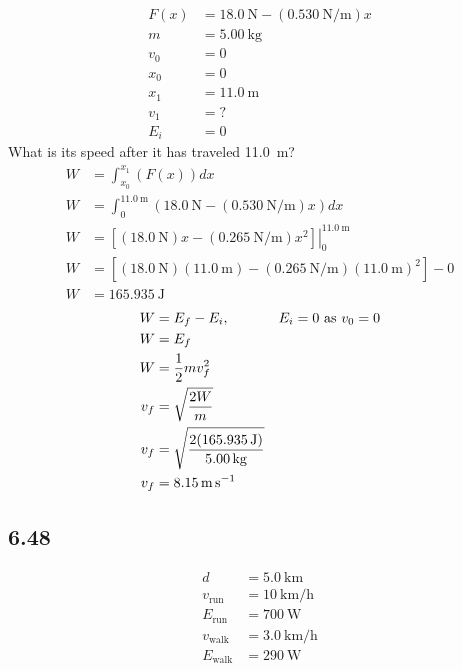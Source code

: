 \documentclass{article}
\begin{document}
\begin{align*}
	F(x) & = \SI{18.0}{\newton} - (\SI{0.530}{\newton \per \meter})x \\
	m & = \SI{5.00}{\kilogram} \\
	v_0 & = 0 \\
	x_0 & = 0 \\
	x_1 & = \SI{11.0}{\meter} \\
	v_1 & = ? \\
	E_i & = 0
\end{align*}
What is its speed after it has traveled \SI{11.0}{\meter}?
\begin{align*}
	W & = \int_{x_0}^{x_1} \left( F(x) \right) dx \\
	W & = \int_{0}^{\SI{11.0}{\meter}} \left( \SI{18.0}{\newton} - (\SI{0.530}{\newton \per \meter})x \right) dx \\
	W & = \left. \left[ (\SI{18.0}{\newton})x - (\SI{0.265}{\newton \per \meter})x^2 \right] \right|_{0}^{\SI{11.0}{\meter}} \\
	W & = \left[ (\SI{18.0}{\newton})(\SI{11.0}{\meter}) - (\SI{0.265}{\newton \per \meter})(\SI{11.0}{\meter})^2 \right] - 0 \\
	W & = \SI{165.935}{\joule}
\end{align*}
\begin{align*}
	W & = E_f - E_i, & \text{$ E_i = 0 $ as $ v_0 = 0 $} \\
	W & = E_f \\
	W & = \frac{1}{2}mv_f^2 \\
	v_f & = \sqrt{ \frac{2W}{m} } \\
	v_f & = \sqrt{ \frac{2(\SI{165.935}{\joule})}{\SI{5.00}{\kilogram}} } \\
	v_f & = \SI{8.15}{\meter \per \second}
\end{align*}

\subsection{6.48}

\begin{align*}
	d & = \SI{5.0}{\kilo \meter} \\
	v_\text{run} & = \SI{10}{\kilo \meter \per \hour} \\
	E_\text{run} & = \SI{700}{\watt} \\
	v_\text{walk} & = \SI{3.0}{\kilo \meter \per \hour} \\
	E_\text{walk} & = \SI{290}{\watt}
\end{align*}
\end{document}
